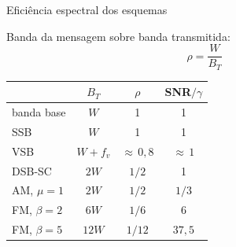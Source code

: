 
\begin{frame}{Eficiência espectral dos esquemas}

\small\compacto
Banda da mensagem sobre banda transmitida:
\[
\rho = \frac{W}{B_T}
\]
\begin{center}
\begin{tabular}{l c c c}
\toprule
 & $B_T$ & $\rho$ & SNR$/\gamma$ \\
\midrule
\pause
banda base & $W$ & 1 & 1 \\
\pause
SSB & $W$ & 1 & 1 \\
\pause
VSB & $W + f_v$ & ${\approx}\,0{,}8$ & ${\approx}\,1$ \\
\pause
DSB-SC & $2W$ & $1/2$ & 1 \\
\pause
AM, $\mu = 1$ & $2W$ & $1/2$ & $1/3$ \\
\pause
FM, $\beta = 2$ & $6W$ & $1/6$ & 6 \\
FM, $\beta = 5$ & $12W$ & $1/12$ & $37{,}5$ \\
\bottomrule
\end{tabular}
\end{center}


\end{frame}


